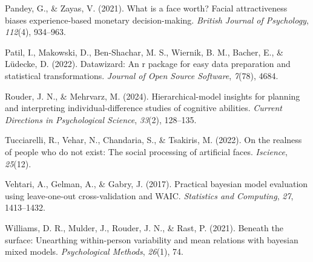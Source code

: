 \documentclass[
  jou,
  floatsintext,
  longtable,
  nolmodern,
  notxfonts,
  notimes,
  colorlinks=true,linkcolor=blue,citecolor=blue,urlcolor=blue]{apa7}
\newlength{\cslhangindent}
\newenvironment{CSLReferences}[2] %
 {\begin{list}{}{%
  \setlength{\itemindent}{0pt}
  \setlength{\leftmargin}{0pt}
  \setlength{\parsep}{0pt}
  \ifodd #1
   \setlength{\leftmargin}{\cslhangindent}
   \setlength{\itemindent}{-1\cslhangindent}
  \fi
  \setlength{\itemsep}{#2\baselineskip}}}
 {\end{list}}
\begin{document}
\begin{CSLReferences}{1}{0}
Pandey, G., \& Zayas, V. (2021). What is a face worth? Facial
attractiveness biases experience-based monetary decision-making.
\emph{British Journal of Psychology}, \emph{112}(4), 934--963.

Patil, I., Makowski, D., Ben-Shachar, M. S., Wiernik, B. M., Bacher, E.,
\& Lüdecke, D. (2022). Datawizard: An r package for easy data
preparation and statistical transformations. \emph{Journal of Open
Source Software}, \emph{7}(78), 4684.

Rouder, J. N., \& Mehrvarz, M. (2024). Hierarchical-model insights for
planning and interpreting individual-difference studies of cognitive
abilities. \emph{Current Directions in Psychological Science},
\emph{33}(2), 128--135.

Tucciarelli, R., Vehar, N., Chandaria, S., \& Tsakiris, M. (2022). On
the realness of people who do not exist: The social processing of
artificial faces. \emph{Iscience}, \emph{25}(12).

Vehtari, A., Gelman, A., \& Gabry, J. (2017). Practical bayesian model
evaluation using leave-one-out cross-validation and WAIC.
\emph{Statistics and Computing}, \emph{27}, 1413--1432.

Williams, D. R., Mulder, J., Rouder, J. N., \& Rast, P. (2021). Beneath
the surface: Unearthing within-person variability and mean relations
with bayesian mixed models. \emph{Psychological Methods}, \emph{26}(1),
74.

\end{CSLReferences}
\end{document}
